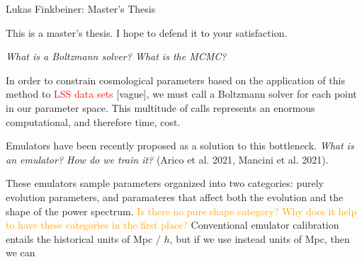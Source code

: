 \documentclass[11pt]{article}
\begin{document}
\fontsize{12}{15}

\begin{center}
Lukas Finkbeiner: Master's Thesis
\end{center}

This is a master's thesis. I hope to defend it to your satisfaction.

\textit{What is a Boltzmann solver? What is the MCMC?}

In order to constrain cosmological parameters based on the application of this method to \textcolor{red}{LSS data sets} [vague], we must call a Boltzmann solver for each point in our parameter space. This multitude of calls represents an enormous computational, and therefore time, cost.

Emulators have been recently proposed as a solution to this bottleneck. \textit{What is an emulator? How do we train it?} (Arico et al. 2021, Mancini et al. 2021).

These emulators sample parameters organized into two categories: purely evolution parameters, and paramateres that affect both the evolution and the shape of the power spectrum. \textcolor{orange}{Is there no pure shape category? Why does it help to have these categories in the first place?} Conventional emulator calibration entails the historical units of Mpc / $h$, but if we use instead units of Mpc, then we can 
\end{document}
